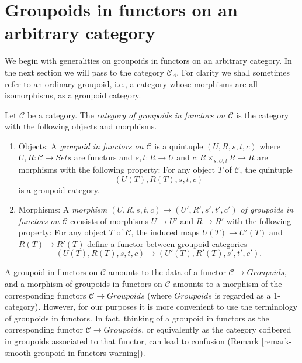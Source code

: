 




\section{Groupoids in functors on an arbitrary category}
\label{section-groupoids-arbitrary}

\noindent
We begin with generalities on groupoids in functors on an
arbitrary category. In the next section we will
pass to the category $\mathcal{C}_\Lambda$.
For clarity we shall sometimes refer to an ordinary groupoid,
i.e., a category whose morphisms are all isomorphisms, as a groupoid category.

\begin{definition}
\label{definition-groupoid-in-functors}
Let $\mathcal{C}$ be a category. The
{\it category of groupoids in functors on $\mathcal{C}$}
is the category with the following objects and morphisms.
\begin{enumerate}
\item Objects: A {\it groupoid in functors on $\mathcal{C}$} is a quintuple
$(U, R, s, t, c)$ where $U, R : \mathcal{C} \to \textit{Sets}$ are
functors and $s, t : R \to U$ and $c : R \times_{s, U, t} R \to R$
are morphisms with the following property: For any object $T$ of $\mathcal{C}$,
the quintuple
$$
(U(T), R(T), s, t, c)
$$
is a groupoid category.
\item Morphisms: A {\it morphism $(U, R, s, t, c) \to (U', R', s', t', c')$ of
groupoids in functors on $\mathcal{C}$} consists of morphisms $U \to U'$
and $R \to R'$ with the following property: For any object $T$ of
$\mathcal{C}$, the induced maps $U(T) \to U'(T)$ and
$R(T) \to R'(T)$ define a functor between groupoid categories
$$
(U(T), R(T), s, t, c) \to (U'(T), R'(T), s', t', c').
$$
\end{enumerate}
\end{definition}

\begin{remark}
\label{remark-confusion-groupoids-in-functors}
A groupoid in functors on $\mathcal{C}$ amounts to the data of a functor
$\mathcal{C} \to \textit{Groupoids}$, and a morphism of groupoids
in functors on $\mathcal{C}$ amounts to a morphism of the corresponding
functors
$\mathcal{C} \to \textit{Groupoids}$ (where
$\textit{Groupoids}$ is regarded as a 1-category).  However, for our
purposes it is more convenient to use the terminology of groupoids in functors.
In fact, thinking of a groupoid in functors as the corresponding functor
$\mathcal{C} \to \textit{Groupoids}$, or equivalently as the
category cofibered in groupoids associated to that functor, can lead to
confusion (Remark \ref{remark-smooth-groupoid-in-functors-warning}).
\end{remark}

